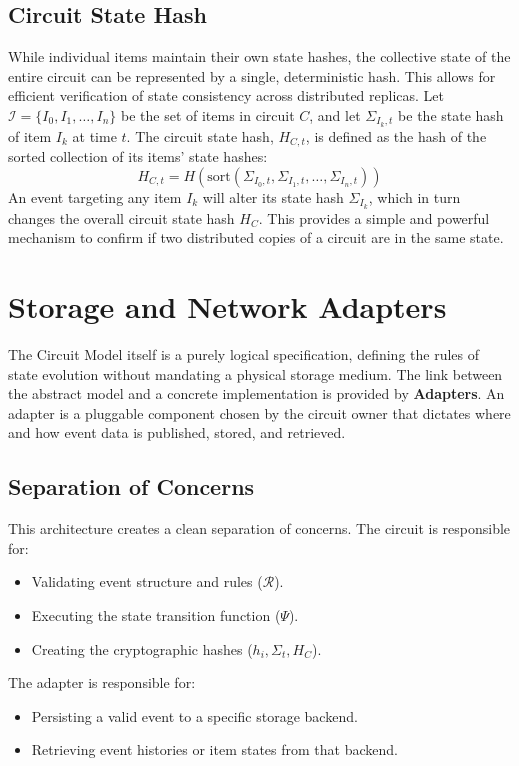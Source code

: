 \documentclass{article}
\begin{document}
\subsection{Circuit State Hash}
While individual items maintain their own state hashes, the collective state of the entire circuit can be represented by a single, deterministic hash. This allows for efficient verification of state consistency across distributed replicas. Let $\mathcal{I} = \{I_0, I_1, \dots, I_n\}$ be the set of items in circuit $C$, and let $\Sigma_{I_k, t}$ be the state hash of item $I_k$ at time $t$. The circuit state hash, $H_{C,t}$, is defined as the hash of the sorted collection of its items' state hashes:
\begin{equation}
H_{C,t} = H(\text{sort}(\Sigma_{I_0, t}, \Sigma_{I_1, t}, \dots, \Sigma_{I_n, t}))
\end{equation}
An event targeting any item $I_k$ will alter its state hash $\Sigma_{I_k}$, which in turn changes the overall circuit state hash $H_C$. This provides a simple and powerful mechanism to confirm if two distributed copies of a circuit are in the same state.

\section{Storage and Network Adapters}
The Circuit Model itself is a purely logical specification, defining the rules of state evolution without mandating a physical storage medium. The link between the abstract model and a concrete implementation is provided by \textbf{Adapters}. An adapter is a pluggable component chosen by the circuit owner that dictates where and how event data is published, stored, and retrieved.

\subsection{Separation of Concerns}
This architecture creates a clean separation of concerns. The circuit is responsible for:
\begin{itemize}
    \item Validating event structure and rules ($\mathcal{R}$).    \item Executing the state transition function ($\Psi$).    \item Creating the cryptographic hashes ($h_i, \Sigma_t, H_C$).\end{itemize}
The adapter is responsible for:
\begin{itemize}
    \item Persisting a valid event to a specific storage backend.    \item Retrieving event histories or item states from that backend.
\end{itemize}
\end{document}
